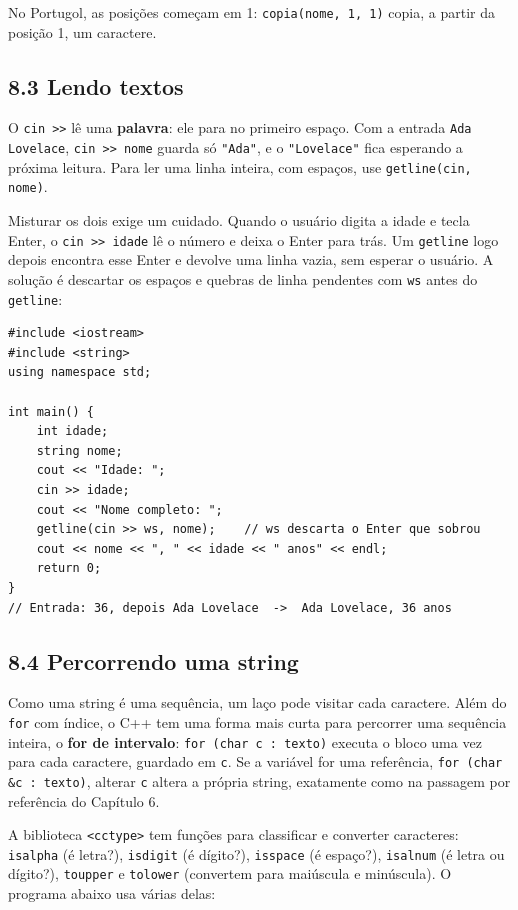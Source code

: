 No Portugol, as posições começam em 1: \texttt{copia(nome, 1, 1)} copia, a partir da posição 1, um caractere.

\subsection{8.3 Lendo textos}

O \texttt{cin >>} lê uma \textbf{palavra}: ele para no primeiro espaço. Com a entrada \texttt{Ada Lovelace}, \texttt{cin >> nome} guarda só \texttt{"Ada"}, e o \texttt{"Lovelace"} fica esperando a próxima leitura. Para ler uma linha inteira, com espaços, use \texttt{getline(cin, nome)}.

Misturar os dois exige um cuidado. Quando o usuário digita a idade e tecla Enter, o \texttt{cin >> idade} lê o número e deixa o Enter para trás. Um \texttt{getline} logo depois encontra esse Enter e devolve uma linha vazia, sem esperar o usuário. A solução é descartar os espaços e quebras de linha pendentes com \texttt{ws} antes do \texttt{getline}:

\begin{codigo}
\begin{Verbatim}[breaklines=true, breaksymbolleft={}, fontsize=\footnotesize]
#include <iostream>
#include <string>
using namespace std;

int main() {
    int idade;
    string nome;
    cout << "Idade: ";
    cin >> idade;
    cout << "Nome completo: ";
    getline(cin >> ws, nome);    // ws descarta o Enter que sobrou
    cout << nome << ", " << idade << " anos" << endl;
    return 0;
}
// Entrada: 36, depois Ada Lovelace  ->  Ada Lovelace, 36 anos
\end{Verbatim}
\end{codigo}

\subsection{8.4 Percorrendo uma string}

Como uma string é uma sequência, um laço pode visitar cada caractere. Além do \texttt{for} com índice, o C++ tem uma forma mais curta para percorrer uma sequência inteira, o \textbf{for de intervalo}: \texttt{for (char c : texto)} executa o bloco uma vez para cada caractere, guardado em \texttt{c}. Se a variável for uma referência, \texttt{for (char \&c : texto)}, alterar \texttt{c} altera a própria string, exatamente como na passagem por referência do Capítulo 6.

A biblioteca \texttt{<cctype>} tem funções para classificar e converter caracteres: \texttt{isalpha} (é letra?), \texttt{isdigit} (é dígito?), \texttt{isspace} (é espaço?), \texttt{isalnum} (é letra ou dígito?), \texttt{toupper} e \texttt{tolower} (convertem para maiúscula e minúscula). O programa abaixo usa várias delas:

